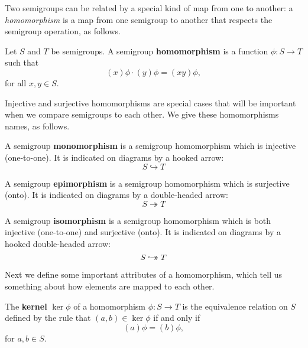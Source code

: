 Two semigroups can be related by a special kind of map from one to another: a
\textit{homomorphism} is a map from one semigroup to another that respects the
semigroup operation, as follows.

\begin{definition}
  \label{def:homomorphism}
  Let $S$ and $T$ be semigroups.  A semigroup \textbf{homomorphism} is a
  function $\phi: S \to T$ such that
  $$(x)\phi \cdot (y)\phi = (xy)\phi,$$
  for all $x, y \in S$.
\end{definition}

Injective and surjective homomorphisms are special cases that will be important
when we compare semigroups to each other.  We give these homomorphisms names, as
follows.

\begin{definition}
  \label{def:monomorphism}
  A semigroup \textbf{monomorphism} is a semigroup homomorphism which is
  injective (one-to-one).  It is indicated on diagrams by a hooked arrow:
  $$S \hookrightarrow T$$
\end{definition}

\begin{definition}
  \label{def:epimorphism}
  A semigroup \textbf{epimorphism} is a semigroup homomorphism which is
  surjective (onto).  It is indicated on diagrams by a double-headed arrow:
  $$S \twoheadrightarrow T$$
\end{definition}

\begin{definition}
  \label{def:isomorphism}
  A semigroup \textbf{isomorphism} is a semigroup homomorphism which is
  both injective (one-to-one) and surjective (onto).  It is indicated on
  diagrams by a hooked double-headed arrow:
  $$S \hookrightarrow\mathrel{\mspace{-15mu}}\rightarrow T$$
\end{definition}

Next we define some important attributes of a homomorphism, which tell us
something about how elements are mapped to each other.

\begin{definition}
  \label{def:kernel-homo}
  The \textbf{kernel} $\ker\phi$ of a homomorphism $\phi:S \to T$ is the
  equivalence relation on $S$ defined by the rule that $(a,b) \in \ker\phi$ if
  and only if
  $$(a)\phi = (b)\phi,$$
  for $a, b \in S$.
\end{definition}

